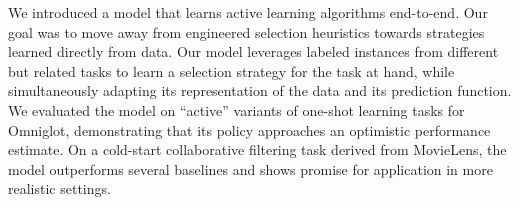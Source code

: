 
We introduced a model that learns active learning algorithms end-to-end. Our goal was to move away from engineered selection heuristics towards strategies learned directly from data. Our model leverages labeled instances from different but related tasks to learn a selection strategy for the task at hand, while simultaneously adapting its representation of the data and its prediction function.
We evaluated the model on ``active'' variants of one-shot learning tasks for Omniglot, demonstrating that its policy approaches an optimistic performance estimate. On a cold-start collaborative filtering task derived from MovieLens, the model outperforms several baselines and shows promise for application in more realistic settings.